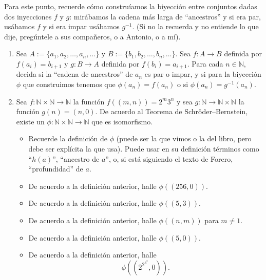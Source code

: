 \documentclass[11pt]{article}
\newcommand{\N}{\mathbb{N}}
\begin{document}
\begin{question}
Para este punto, recuerde cómo construíamos la biyección entre conjuntos dadas dos inyecciones $f$ y $g$: mirábamos la cadena más larga de ``ancestros'' y si era par, usábamos $f$ y si era impar usábamos $g^{-1}$. (Si no la recuerda y no entiende lo que dije, pregúntele a sus compañeros, o a Antonio, o a mí).

\begin{enumerate}
\item[(a)] Sea $A:=\{a_1,a_2,\ldots,a_n,\ldots\}$ y $B:=\{b_1,b_2,\ldots,b_n,\ldots\}$. Sea $f:A\to B$ definida por $f(a_i)=b_{i+1}$ y $g:B\to A$ definida por $f(b_i)=a_{i+1}$. Para cada $n\in\N$, decida si la ``cadena de ancestros'' de $a_n$ es par o impar, y si para la biyección $\phi$ que construimos tenemos que $\phi(a_n)=f(a_n)$ o si $\phi(a_n)=g^{-1}(a_n)$.

\item[(b)] Sea $f:\N\times\N\to\N$ la función $f((m,n))=2^m3^n$ y sea $g:\N\to\N\times\N$ la función $g(n)=(n,0)$. De acuerdo al Teorema de Schröder--Bernstein, existe un $\phi:\N\times\N\to\N$ que es isomorfismo.

\begin{itemize}
  \item Recuerde la definición de $\phi$ (puede ser la que vimos o la del libro, pero debe ser explícita la que usa). Puede usar en su definición términos como ``$h(a)$'', ``ancestro de $a$'', o, si está siguiendo el texto de Forero, ``profundidad'' de $a$.
  \item De acuerdo a la definición anterior, halle $\phi((256,0))$.
  \item De acuerdo a la definición anterior, halle $\phi((5,3))$.
  \item De acuerdo a la definición anterior, halle $\phi((n,m))$ para $m\neq1$.
  \item De acuerdo a la definición anterior, halle $\phi((5,0))$.
  \item De acuerdo a la definición anterior, halle
  \[
  \phi\!\left(\left(2^{2^{3^2}},0\right)\right).
  \]
\end{itemize}
\end{enumerate}
\end{question}
\end{document}
